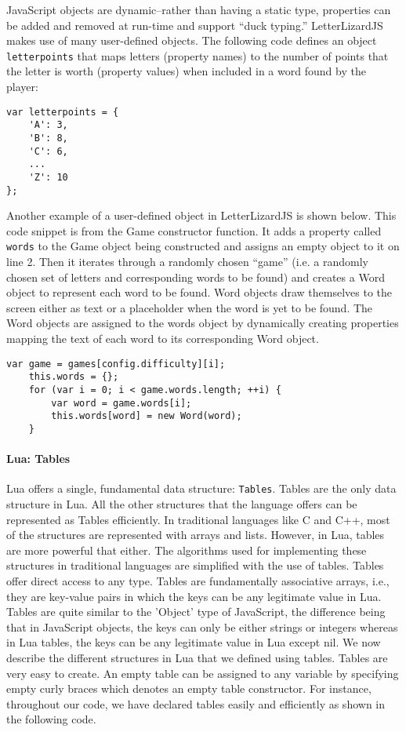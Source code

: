 JavaScript objects are dynamic--rather than having a static type, properties can be added
and removed at run-time and support ``duck typing.'' LetterLizardJS makes use of many
user-defined objects. The following code defines an object \texttt{letterpoints} that
maps letters (property names) to the number of points that the letter is worth
(property values) when included in a word found by the player:

\begin{lstlisting}[caption=A user-defined object in JavaScript.]
var letterpoints = {
	'A': 3,
	'B': 8,
	'C': 6,
	...
	'Z': 10
};
\end{lstlisting}

Another example of a user-defined object in LetterLizardJS is shown below. This code
snippet is from the Game constructor function. It adds a property called 
\texttt{words} to the Game object being constructed and assigns an empty object
to it on line 2. Then it iterates through a randomly chosen ``game'' (i.e. a
randomly chosen set of letters and corresponding words to be found) and creates
a Word object to represent each word to be found. Word objects draw themselves to the
screen either as text or a placeholder when the word is yet to be found. The Word
objects are assigned to the words object by dynamically creating properties mapping
the text of each word to its corresponding Word object.

\begin{lstlisting}[caption=A user-defined object demonstrating dynamic properties.]
	var game = games[config.difficulty][i];
	this.words = {};
	for (var i = 0; i < game.words.length; ++i) {
		var word = game.words[i];
		this.words[word] = new Word(word);
	}
\end{lstlisting}

\paragraph{Lua: Tables}

Lua offers a single, fundamental data structure: \texttt{Tables}. Tables are the only data structure in Lua. All the other structures that the language offers can be represented as Tables efficiently. In traditional languages like C and C++, most of the structures are represented with arrays and lists. However, in Lua, tables are more powerful that either. The algorithms used for implementing these structures in traditional languages are simplified with the use of tables. Tables offer direct access to any type. Tables are fundamentally associative arrays, i.e., they are key-value pairs in which the keys can be any legitimate value in Lua. Tables are quite similar to the 'Object' type of JavaScript, the difference being that in JavaScript objects, the keys can only be either strings or integers whereas in Lua tables, the keys can be any legitimate value in Lua except nil. We now describe the different structures in Lua that we defined using tables.
Tables are very easy to create. An empty table can be assigned to any variable by specifying empty curly braces which denotes an empty table constructor. For instance, throughout our code, we have declared tables easily and efficiently as shown in the following code.

